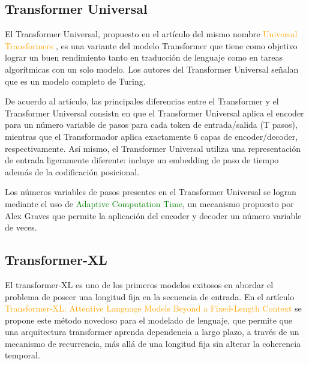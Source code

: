 \documentclass[conference]{IEEEtran}
\begin{document}
\subsection{Transformer Universal}

El Transformer Universal, propuesto en el art\'iculo del mismo nombre \textcolor{orange}{Universal Transformers} \cite{b5}, es una variante del modelo Transformer que tiene como objetivo lograr un buen rendimiento tanto en traducci\'on de lenguaje como en tareas algor\'itmicas con un solo modelo. Los autores del Transformer Universal se\~nalan que es un modelo completo de Turing. 

\vspace{0.2cm}

De acuerdo al art\'iculo, las principales diferencias entre el Transformer y el Transformer Universal consistn en que el Transformer Universal aplica el encoder para un n\'umero variable de pasos para cada token de entrada/salida (T pasos), mientras que el Transformador aplica exactamente $6$ capas de encoder/decoder, respectivamente. As\'i mismo, el Transformer Universal utiliza una representaci\'on de entrada ligeramente diferente: incluye un embedding de paso de tiempo adem\'as de la codificaci\'on posicional.

\vspace{0.2cm}

Los n\'umeros variables de pasos presentes en el Transformer Universal se logran mediante el uso de \textcolor{green}{Adaptive Computation Time}, un mecanismo propuesto por Alex Graves \cite{b6} que permite la aplicaci\'on del encoder y decoder un n\'umero variable de veces.
	
\vspace{0.2cm}

\subsection{Transformer-XL}

El transformer-XL es uno de los primeros modelos exitosos en abordar el problema de poseer una longitud fija en la secuencia de entrada. En el art\'iculo \textcolor{orange}{Transformer-XL: Attentive Language Models Beyond a Fixed-Length Context} \cite{b7} se propone este m\'etodo novedoso para el modelado de lenguaje, que permite que una arquitectura transformer aprenda dependencia a largo plazo, a trav\'es de un mecanismo de recurrencia, m\'as all\'a de una longitud fija sin alterar la coherencia temporal.
\end{document}
